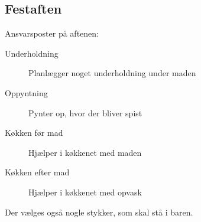\documentclass[../../../main.tex]{subfiles}
\begin{document}
\subsection{Festaften}
Ansvarsposter på aftenen:
\begin{description}
\item[Underholdning] Planlægger noget underholdning under maden
\item[Oppyntning] Pynter op, hvor der bliver spist
\item[Køkken før mad] Hjælper i køkkenet med maden
\item[Køkken efter mad] Hjælper i køkkenet med opvask
\end{description}

Der vælges også nogle stykker, som skal stå i baren.
\end{document}
